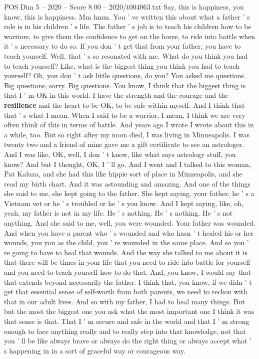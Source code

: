 \begin{textsample}{POS Dim 5 – 2020 – Score 8.00 – 2020/t004063.txt}
Say, this is happiness, you know, this is happiness.
Mm hmm.
You ' ve written this about what a father ' s role is in his children ' s life.
The father ' s job is to teach his children how to be warriors, to give them the confidence to get on the horse, to ride into battle when it ' s necessary to do so.
If you don ' t get that from your father, you have to teach yourself.
Well, that ' s so resonated with me.
What do you think you had to teach yourself?
Like, what is the biggest thing you think you had to teach yourself?
Oh, you don ' t ask little questions, do you?
You asked me questions.
Big questions, sorry.
Big questions.
You know, I think that the biggest thing is that I ' m OK in this world.
I have the strength and the courage and the \textbf{resilience} and the heart to be OK, to be safe within myself.
And I think that that ' s what I mean.
When I said to be a warrior, I mean, I think we are very often think of this in terms of battle.
And years ago I wrote I wrote about this in a while, too.
But so right after my mom died, I was living in Minneapolis.
I was twenty two and a friend of mine gave me a gift certificate to see an astrologer.
And I was like, OK, well, I don ' t know, like what says astrology stuff, you know?
And but I thought, OK, I ' ll go.
And I went and I talked to this woman, Pat Kaluza, and she had this like hippie sort of place in Minneapolis, and she read my birth chart.
And it was astounding and amazing.
And one of the things she said to me, she kept going to the father.
She kept saying, your father, he ' s a Vietnam vet or he ' s troubled or he ' s you know.
And I kept saying, like, oh, yeah, my father is not in my life.
He ' s nothing.
He ' s nothing.
He ' s not anything.
And she said to me, well, you were wounded.
Your father was wounded.
And when you have a parent who ' s wounded and who hasn ' t healed his or her wounds, you you as the child, you ' re wounded in the same place.
And so you ' re going to have to heal that wounds.
And the way she talked to me about it is that there will be times in your life that you need to ride into battle for yourself and you need to teach yourself how to do that.
And, you know, I would say that that extends beyond necessarily the father.
I think that, you know, if we didn ' t get that essential sense of self-worth from both parents, we need to reckon with that in our adult lives.
And so with my father, I had to heal many things.
But but the most the biggest one you ask what the most important one I think it was that sense is that.
That I ' m secure and safe in the world and that I ' m strong enough to face anything really and to really step into that knowledge, not that you ' ll be like always brave or always do the right thing or always accept what ' s happening in in a sort of graceful way or courageous way.

\end{textsample}
